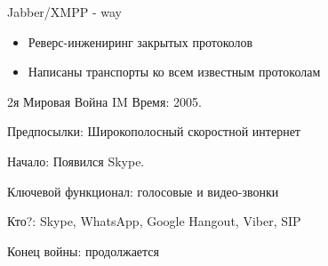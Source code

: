 \begin{frame}{Jabber/XMPP - way}
  \begin{itemize}
    \item Реверс-инжениринг закрытых протоколов
    \item Написаны транспорты ко всем известным протоколам
  \end{itemize}
\end{frame}

\begin{frame}{2я Мировая Война IM}
    \alert{Время}:  2005. 

    \alert{Предпосылки}: Широкополосный скоростной интернет
    
    \alert{Начало}: Появился Skype. 
      
    \alert{Ключевой функционал}: голосовые и видео-звонки

    \alert{Кто?}: Skype, WhatsApp, Google Hangout, Viber, SIP

    \alert{Конец войны}: продолжается
\end{frame}

{
}

